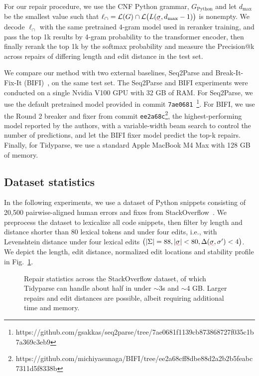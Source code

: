 \documentclass[sigplan,review,acmsmall,nonacm,screen,anonymous]{acmart}\settopmatter{printfolios=false,printccs=false,printacmref=false}
\begin{document}
For our repair procedure, we use the CNF Python grammar, $G_{\text{Python}}$ and let $d_{\max}$ be the smallest value such that $\ell_\cap = \mathcal{L}(G)\cap\mathcal{L}\big(L(\err\sigma, d_{\max} - 1)\big)$ is nonempty. We decode $\ell_\cap$ with the same pretrained $4$-gram model used in reranker training, and pass the top 1k results by 4-gram probability to the transformer encoder, then finally rerank the top 1k by the softmax probability and measure the Precision@k across repairs of differing length and edit distance in the test set.

We compare our method with two external baselines, Seq2Parse and Break-It-Fix-It (BIFI)~\cite{yasunaga2021break}, on the same test set. The Seq2Parse and BIFI experiments were conducted on a single Nvidia V100 GPU with 32 GB of RAM. For Seq2Parse, we use the default pretrained model provided in commit \texttt{7ae0681}~\footnote{https://github.com/gsakkas/seq2parse/tree/7ae0681f1139cb873868727f035c1b7a369c3eb9}. For BIFI, we use the Round 2 breaker and fixer from commit \texttt{ee2a68c}\footnote{https://github.com/michiyasunaga/BIFI/tree/ee2a68cff8dbe88d2a2b2b5feabc7311d5f8338b}, the highest-performing model reported by the authors, with a variable-width beam search to control the number of predictions, and let the BIFI fixer model predict the top-k repairs. Finally, for Tidyparse, we use a standard Apple MacBook M4 Max with 128 GB of memory.

\clearpage\subsection{Dataset statistics}\label{sec:rq1}

In the following experiments, we use a dataset of Python snippets consisting of 20,500 pairwise-aligned human errors and fixes from StackOverflow~\cite{wong2019syntax}. We preprocess the dataset to lexicalize all code snippets, then filter by length and distance shorter than 80 lexical tokens and under four edits, i.e., with Levenshtein distance under four lexical edits $\big(|\Sigma| = 88, |\err{\sigma}| < 80, \Delta(\err{\sigma}, \sigma') < 4\big)$. We depict the length, edit distance, normalized edit locations and stability profile in Fig.~\ref{fig:patch_stats}.\vspace{-0.2cm}

\begin{figure}[h!]

\vspace{-0.2cm}
\caption{Repair statistics across the StackOverflow dataset, of which Tidyparse can handle about half in under $\sim$3s and $\sim$4 GB. Larger repairs and edit distances are possible, albeit requiring additional time and memory.}\label{fig:patch_stats}\vspace{-0.2cm}
\end{figure}
\end{document}
